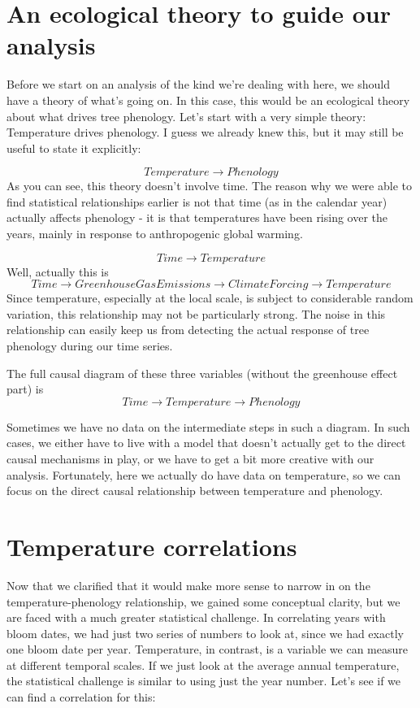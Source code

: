 \documentclass[
]{book}
\begin{document}
\hypertarget{an-ecological-theory-to-guide-our-analysis}{%
\section{An ecological theory to guide our analysis}\label{an-ecological-theory-to-guide-our-analysis}}

Before we start on an analysis of the kind we're dealing with here, we should have a theory of what's going on. In this case, this would be an ecological theory about what drives tree phenology. Let's start with a very simple theory: Temperature drives phenology. I guess we already knew this, but it may still be useful to state it explicitly:

\[Temperature \to Phenology\]
As you can see, this theory doesn't involve time. The reason why we were able to find statistical relationships earlier is not that time (as in the calendar year) actually affects phenology - it is that temperatures have been rising over the years, mainly in response to anthropogenic global warming.

\[Time \to Temperature\]
Well, actually this is \[Time \to GreenhouseGasEmissions \to ClimateForcing \to Temperature\]
Since temperature, especially at the local scale, is subject to considerable random variation, this relationship may not be particularly strong. The noise in this relationship can easily keep us from detecting the actual response of tree phenology during our time series.

The full causal diagram of these three variables (without the greenhouse effect part) is \[Time \to Temperature \to Phenology\]

Sometimes we have no data on the intermediate steps in such a diagram. In such cases, we either have to live with a model that doesn't actually get to the direct causal mechanisms in play, or we have to get a bit more creative with our analysis. Fortunately, here we actually do have data on temperature, so we can focus on the direct causal relationship between temperature and phenology.

\hypertarget{temperature-correlations}{%
\section{Temperature correlations}\label{temperature-correlations}}

Now that we clarified that it would make more sense to narrow in on the temperature-phenology relationship, we gained some conceptual clarity, but we are faced with a much greater statistical challenge. In correlating years with bloom dates, we had just two series of numbers to look at, since we had exactly one bloom date per year. Temperature, in contrast, is a variable we can measure at different temporal scales. If we just look at the average annual temperature, the statistical challenge is similar to using just the year number. Let's see if we can find a correlation for this:
\end{document}
